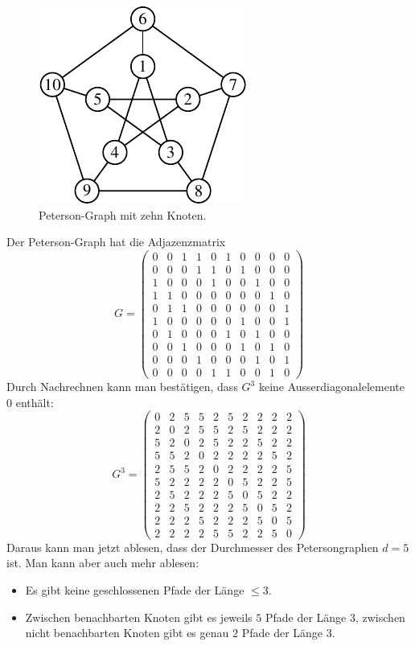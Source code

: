 \begin{beispiel}
\begin{figure}
\centering
\includegraphics{chapters/70-graphen/images/peterson.pdf}
\caption{Peterson-Graph mit zehn Knoten.
\label{buch:figure:peterson}}
\end{figure}
Der Peterson-Graph hat die Adjazenzmatrix
\[
G
=
\begin{pmatrix}
 0& 0& 1& 1& 0& 1& 0& 0& 0& 0\\ %
 0& 0& 0& 1& 1& 0& 1& 0& 0& 0\\ %
 1& 0& 0& 0& 1& 0& 0& 1& 0& 0\\ %
 1& 1& 0& 0& 0& 0& 0& 0& 1& 0\\ %
 0& 1& 1& 0& 0& 0& 0& 0& 0& 1\\ %
 1& 0& 0& 0& 0& 0& 1& 0& 0& 1\\ %
 0& 1& 0& 0& 0& 1& 0& 1& 0& 0\\ %
 0& 0& 1& 0& 0& 0& 1& 0& 1& 0\\ %
 0& 0& 0& 1& 0& 0& 0& 1& 0& 1\\ %
 0& 0& 0& 0& 1& 1& 0& 0& 1& 0   %
\end{pmatrix}
\]
Durch Nachrechnen kann man bestätigen, dass $G^3$ keine
Ausserdiagonalelemente $0$ enthält:
\[
G^3
=
\begin{pmatrix}
 0& 2& 5& 5& 2& 5& 2& 2& 2& 2\\
 2& 0& 2& 5& 5& 2& 5& 2& 2& 2\\
 5& 2& 0& 2& 5& 2& 2& 5& 2& 2\\
 5& 5& 2& 0& 2& 2& 2& 2& 5& 2\\
 2& 5& 5& 2& 0& 2& 2& 2& 2& 5\\
 5& 2& 2& 2& 2& 0& 5& 2& 2& 5\\
 2& 5& 2& 2& 2& 5& 0& 5& 2& 2\\
 2& 2& 5& 2& 2& 2& 5& 0& 5& 2\\
 2& 2& 2& 5& 2& 2& 2& 5& 0& 5\\
 2& 2& 2& 2& 5& 5& 2& 2& 5& 0
\end{pmatrix}
\]
Daraus kann man jetzt ablesen, dass der Durchmesser des Petersongraphen
$d=5$ ist.
Man kann aber auch mehr ablesen:
\begin{itemize}
\item
Es gibt keine geschlossenen Pfade der Länge $\le 3$.
\item
Zwischen benachbarten Knoten gibt es jeweils $5$ Pfade der Länge $3$,
zwischen nicht benachbarten Knoten gibt es genau $2$ Pfade der Länge $3$.
\qedhere
\end{itemize}
\end{beispiel}

